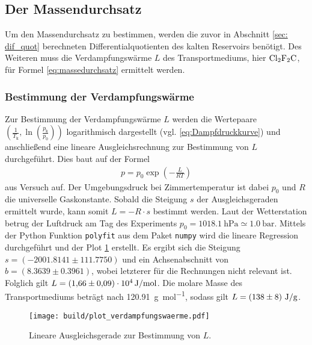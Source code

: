 \subsection{Der Massendurchsatz}
Um den Massendurchsatz zu bestimmen, werden die zuvor in Abschnitt \ref{sec: dif_quot}
berechneten Differentialquotienten des kalten Reservoirs benötigt.
Des Weiteren muss die Verdampfungswärme $L$ des Transportmediums, hier $\ce{Cl2F2C}$, für Formel \eqref{eq:massedurchsatz} ermittelt werden.


\subsubsection{Bestimmung der Verdampfungswärme}
Zur Bestimmung der Verdampfungswärme $L$ werden die Wertepaare $\left(\frac{1}{T_{\text{k}}}, \ln{\left(\frac{p_{\text{k}}}{p_0}\right)}\right)$ logarithmisch dargestellt (vgl. \eqref{eq:Dampfdruckkurve})
und anschließend eine lineare Ausgleichsrechnung zur Bestimmung von $L$ durchgeführt.
Dies baut auf der Formel 
\begin{align*}
    p = p_0 \exp{\left(-\frac{L}{RT}\right)}
\end{align*}
aus Versuch \cite[]{man:v203} auf.
Der Umgebungsdruck bei Zimmertemperatur ist dabei $p_0$ und $R$ die universelle Gaskonstante.
Sobald die Steigung $s$ der Ausgleichsgeraden ermittelt wurde, kann somit $L = -R \cdot s$ bestimmt werden.
Laut der Wetterstation \cite*[][]{wetterstation} betrug der Luftdruck am Tag des Experiments
$p_0 = \qty[]{1018.1}{\hecto\pascal} \simeq \qty[]{1.0}{\bar}$.
Mittels der Python \cite[]{python} Funktion \texttt{polyfit} aus dem Paket \texttt{numpy} \cite[]{numpy} wird die lineare Regression durchgeführt und
der Plot \ref{fig:ausgleichsgerade} erstellt.
Es ergibt sich die Steigung $s = \left(\num[]{-2001.8141}\pm \num[]{111.7750} \right)$ und ein Achsenabschnitt von 
$b = \left( \num[]{8.3639} \pm \num[]{0.3961} \right)$, 
wobei letzterer für die Rechnungen nicht relevant ist. 
Folglich gilt $L = \left(\num[]{1.66 \pm 0.09} \right) \cdot 10^{4} \, \unit[]{\joule\per\mol}$. 
Die molare Masse des Transportmediums beträgt nach \cite[]{gestis} \qty[]{120.91}{\gram\per\mol}, sodass gilt
$L = \left(\num[]{138 \pm 8} \right) \, \unit[]{\joule\per\gram}$.

\begin{figure}[H]
    \texttt{[image: build/plot\_verdampfungswaerme.pdf]}
    \caption[]{Lineare Ausgleichsgerade zur Bestimmung von $L$.}
    \label{fig:ausgleichsgerade}
\end{figure}

